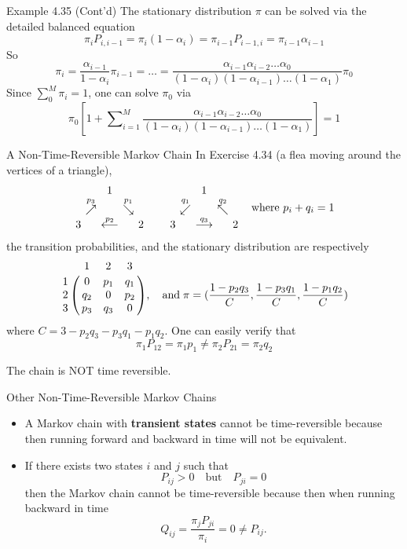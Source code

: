 \documentclass[letterpaper, mathserif]{beamer}
\def\Sum{\sum\nolimits}
\begin{document}
\begin{frame}{Example 4.35 (Cont'd)}
The stationary distribution $\pi$ can be solved via the detailed balanced equation
$$\pi_iP_{i,i-1}=\pi_i(1-\alpha_{i}) =\pi_{i-1}P_{i-1,i}=\pi_{i-1}\alpha_{i-1}$$
So
$$
\pi_{i}=\frac{\alpha_{i-1}}{1-\alpha_{i}}\pi_{i-1}=\ldots
=\frac{\alpha_{i-1}\alpha_{i-2}\ldots\alpha_{0}}{(1-\alpha_{i})(1-\alpha_{i-1})\ldots(1-\alpha_1)}\pi_0
$$
Since $\sum_0^M \pi_i=1$, one can solve $\pi_0$ via
$$
\pi_0\left[1+\Sum_{i=1}^M\frac{\alpha_{i-1}\alpha_{i-2}\ldots\alpha_{0}}{(1-\alpha_{i})(1-\alpha_{i-1})\ldots(1-\alpha_1)}\right]=1
$$
\end{frame}
\begin{frame}{A Non-Time-Reversible Markov Chain}
In Exercise 4.34 (a flea moving around the vertices of a triangle), 
$$
\arraycolsep=2pt
\begin{array}{ccccc}
&&1&&\\
&\stackrel{p_3}{\nearrow}&&\stackrel{p_1}{\searrow}\\
3&&\stackrel{p_2}{\longleftarrow}&& 2
\end{array}\quad\quad
\begin{array}{ccccc}
&&1&&\\
&\stackrel{q_1}{\swarrow}&&\stackrel{q_2}{\nwarrow}\\
3&&\stackrel{q_3}{\longrightarrow}&& 2
\end{array}\quad\text{where }p_i+q_i=1
$$
the transition probabilities,
and the stationary distribution are respectively
$$
\bordermatrix{%
 & 1  & 2   & 3\cr
1& 0  & p_1 & q_1\cr
2&q_2 & 0   & p_2\cr
3&p_3 & q_3 & 0
},
\quad\mbox{and}\; \pi=(\frac{1-p_2q_3}{C},\frac{1-p_3q_1}{C},\frac{1-p_1q_2}{C})
$$
where $C=3-p_2q_3-p_3q_1-p_1q_2$. One can easily verify that
$$
\pi_1 P_{12}=\pi_1 p_1\neq \pi_2 P_{21}=\pi_2 q_2
$$
\begin{center}
The chain is NOT time reversible.
\end{center}
\end{frame}
\begin{frame}{Other Non-Time-Reversible Markov Chains}
\begin{itemize}
\item A Markov chain with {\bf transient states} cannot be time-reversible because then running forward and backward in time will not be equivalent.\vspace{40pt}
\item If there exists two states $i$ and $j$ such that
$$P_{ij}>0\quad\text{but}\quad P_{ji}=0$$
then the Markov chain cannot be time-reversible because then when running backward in time
$$Q_{ij}=\frac{\pi_j P_{ji}}{\pi_i}=0\neq P_{ij}.$$
\end{itemize}
\end{frame}
\end{document}
